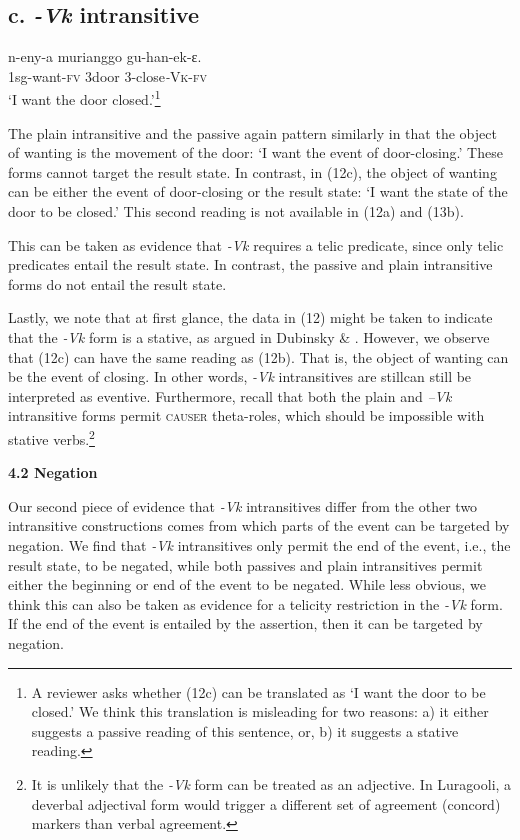 \documentclass[output=paper]{langsci/langscibook}
\begin{document}
\begin{styleTabellenberschrift}
\chapter[c. {}-Vk intransitive]{c. \textbf{\textit{{}-Vk }}\textbf{intransitive}}
\gll \textbf{  }n-eny-a         murianggo gu-han-ek-ɛ.\\
     \textit{  }1sg-want-\textsc{fv} 3door        3-close\textit{{}-}\textsc{Vk}{}-\textsc{fv}\\
\glt ‘I want the door closed.’\footnote{ A reviewer asks whether (12c) can be translated as ‘I want the door to be closed.’ We think this translation is misleading for two reasons: a) it either suggests a passive reading of this sentence, or, b) it suggests a stative reading.}
\z

The plain intransitive and the passive again pattern similarly in that the object of wanting is the movement of the door: ‘I want the event of door-closing.’ These forms cannot target the result state. In contrast, in (12c), the object of wanting can be either the event of door-closing or the result state: ‘I want the state of the door to be closed.’ This second reading is not available in (12a) and (13b).

  This can be taken as evidence that \textit{{}-Vk} requires a telic predicate, since only telic predicates entail the result state. In contrast, the passive and plain intransitive forms do not entail the result state.%
%

Lastly, we note that at first glance, the data in (12) might be taken to indicate that the \textit{{}-Vk} form is a stative, as argued in Dubinsky \& \citet{Simango1996}. However, we observe that (12c) can have the same reading as (12b). That is, the object of wanting can be the event of closing. In other words, \textit{{}-Vk} intransitives are stillcan still be interpreted as eventive. Furthermore, recall that both the plain and \textit{–Vk }intransitive forms permit \textsc{causer} theta-roles, which should be impossible with stative verbs.\footnote{It is unlikely that the \textit{{}-Vk} form can be treated as an adjective. In Luragooli, a deverbal adjectival form would trigger a different set of agreement (concord) markers than verbal agreement.}

\textbf{4.2 Negation} 

Our second piece of evidence that \textit{{}-}\textit{Vk }intransitives differ from the other two intransitive constructions comes from which parts of the event can be targeted by negation. We find that \textit{{}-Vk }intransitives only permit the end of the event, i.e., the result state, to be negated, while both passives and plain intransitives permit either the beginning or end of the event to be negated. While less obvious, we think this can also be taken as evidence for a telicity restriction in the \textit{{}-Vk} form. If the end of the event is entailed by the assertion, then it can be targeted by negation. 


\end{styleTabellenberschrift}
\end{document}
